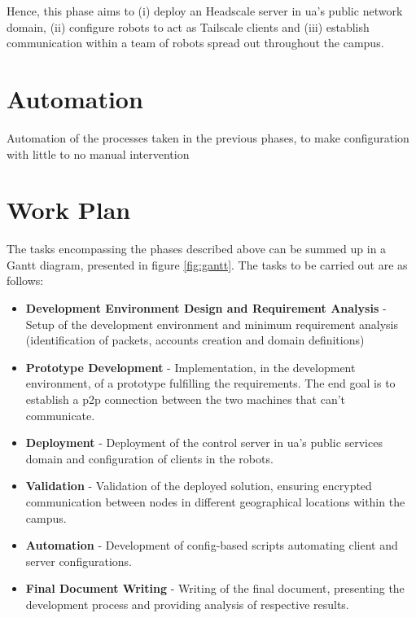 \documentclass[11pt,twoside,a4paper]{report}
\begin{document}
Hence, this phase aims to (i) deploy an Headscale server in \ac{ua}'s public network domain, (ii) configure robots to act as Tailscale clients and (iii) establish communication within a team of robots spread out throughout the campus.


\section{Automation}

Automation of the processes taken in the previous phases, to make configuration with little to no manual intervention

\section{Work Plan}

The tasks encompassing the phases described above can be summed up in a Gantt diagram, presented in figure \ref{fig:gantt}. The tasks to be carried out are as follows:

\begin{itemize}
  \item \textbf{Development Environment Design and Requirement Analysis} - Setup of the development environment and minimum requirement analysis (identification of packets, accounts creation and domain definitions)
  \item \textbf{Prototype Development} - Implementation, in the development environment, of a prototype fulfilling the requirements. The end goal is to establish a \ac{p2p} connection between the two machines that can't communicate.
  \item \textbf{Deployment} - Deployment of the control server in \ac{ua}'s public services domain and configuration of clients in the robots.
  \item \textbf{Validation} - Validation of the deployed solution, ensuring encrypted communication between nodes in different geographical locations within the campus.
  \item \textbf{Automation} - Development of config-based scripts automating client and server configurations.
  \item \textbf{Final Document Writing} - Writing of the final document, presenting the development process and providing analysis of respective results.
\end{itemize}
\end{document}
